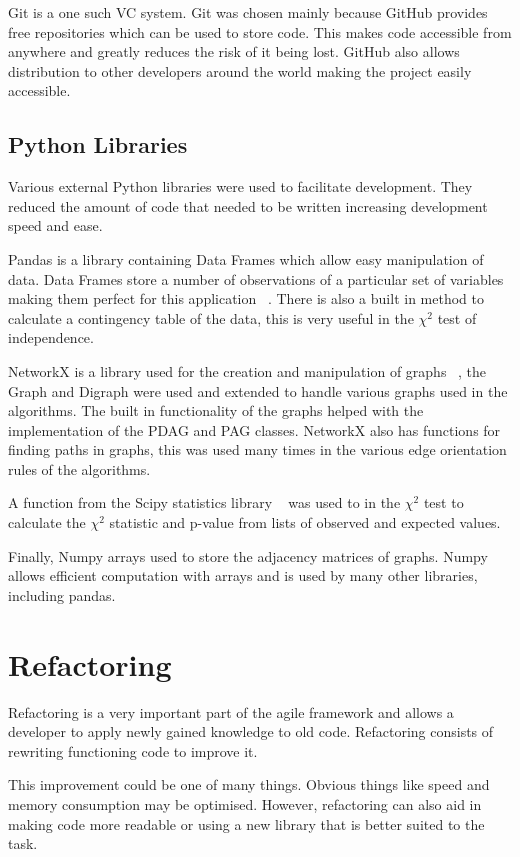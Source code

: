 \documentclass{UoYCSproject}
\begin{document}
Git is a one such VC system. Git was chosen mainly because GitHub provides free repositories which can be used to store code. This makes code accessible from anywhere and greatly reduces the risk of it being lost. GitHub also allows distribution to other developers around the world making the project easily accessible.

\subsection{Python Libraries}
Various external Python libraries were used to facilitate development. They reduced the amount of code that needed to be written increasing development speed and ease.

Pandas is a library containing Data Frames which allow easy manipulation of data. Data Frames store a number of observations of a particular set of variables making them perfect for this application ~\parencite{pandas}. There is also a built in method to calculate a contingency table of the data, this is very useful in the $\chi^2$ test of independence.

NetworkX is a library used for the creation and manipulation of graphs ~\parencite{networkx}, the Graph and Digraph were used and extended to handle various graphs used in the algorithms. The built in functionality of the graphs helped with the implementation of the PDAG and PAG classes. NetworkX also has functions for finding paths in graphs, this was used many times in the various edge orientation rules of the algorithms.

A function from the Scipy statistics library ~\parencite{scipy} was used to in the $\chi^2$ test to calculate the $\chi^2$ statistic and p-value from lists of observed and expected values.

Finally, Numpy arrays used to store the adjacency matrices of graphs. Numpy allows efficient computation with arrays and is used by many other libraries, including pandas. ~\parencite{numpy}  

\section{Refactoring}
Refactoring is a very important part of the agile framework and allows a developer to apply newly gained knowledge to old code. Refactoring consists of rewriting functioning code to improve it.

This improvement could be one of many things. Obvious things like speed and memory consumption may be optimised. However, refactoring can also aid in making code more readable or using a new library that is better suited to the task.
\end{document}
